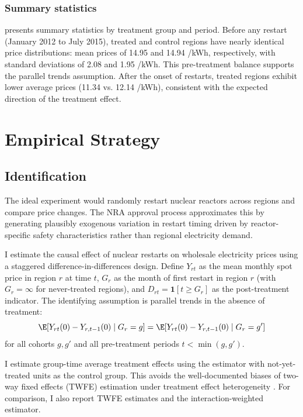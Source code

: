 \documentclass[12pt]{article}
\newcommand{\yen}{\textyen}
\begin{document}
\subsubsection*{Summary statistics}  presents summary statistics by treatment group and period. Before any restart (January 2012 to July 2015), treated and control regions have nearly identical price distributions: mean prices of 14.95 and 14.94 \yen/kWh, respectively, with standard deviations of 2.08 and 1.95 \yen/kWh. This pre-treatment balance supports the parallel trends assumption. After the onset of restarts, treated regions exhibit lower average prices (11.34 vs. 12.14 \yen/kWh), consistent with the expected direction of the treatment effect.




\section{Empirical Strategy}
\label{sec:strategy}

\subsection{Identification}

The ideal experiment would randomly restart nuclear reactors across regions and compare price changes. The NRA approval process approximates this by generating plausibly exogenous variation in restart timing driven by reactor-specific safety characteristics rather than regional electricity demand.

I estimate the causal effect of nuclear restarts on wholesale electricity prices using a staggered difference-in-differences design. Define $Y_{rt}$ as the mean monthly spot price in region $r$ at time $t$, $G_r$ as the month of first restart in region $r$ (with $G_r = \infty$ for never-treated regions), and $D_{rt} = \mathbf{1}[t \geq G_r]$ as the post-treatment indicator. The identifying assumption is parallel trends in the absence of treatment:
\begin{equation}
\E[Y_{rt}(0) - Y_{r,t-1}(0) \mid G_r = g] = \E[Y_{rt}(0) - Y_{r,t-1}(0) \mid G_r = g']
\end{equation}
for all cohorts $g, g'$ and all pre-treatment periods $t < \min(g, g')$.

I estimate group-time average treatment effects using the \citet{Callaway2021} estimator with not-yet-treated units as the control group. This avoids the well-documented biases of two-way fixed effects (TWFE) estimation under treatment effect heterogeneity \citep{DeChaisemartin2020, Goodman-Bacon2021}. For comparison, I also report TWFE estimates and the \citet{Sun2021} interaction-weighted estimator.
\end{document}
